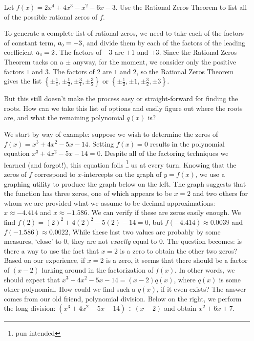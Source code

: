 \documentclass{ximera}
\begin{document}
\begin{example}
    Let $f(x) = 2x^4+4x^3-x^2-6x-3$. Use the Rational Zeros Theorem to list all of the possible rational zeros of $f$.
\end{example}

\begin{exampleSol}
    To generate a complete list of rational zeros, we need to take each of the factors of constant term, $a_{\mbox{\tiny$0$}} = -3$, and divide them by each of the factors of the leading coefficient $a_{\mbox{\tiny$4$}} = 2$.  The factors of $-3$ are $\pm  1$ and $\pm  3$.  Since the Rational Zeros Theorem tacks on a $\pm$ anyway, for the moment, we consider only the positive factors $1$ and $3$.  The factors of $2$ are  $1$ and $2$, so the Rational Zeros Theorem gives the list 
    $\left\{\pm  \frac{1}{1}, \pm  \frac{1}{2},  \pm  \frac{3}{1}, \pm  \frac{3}{2}\right\}$ or $\left\{\pm  \frac{1}{2}, \pm  1, \pm  \frac{3}{2}, \pm  3\right\}$.   
    \label{RZTex}
\end{exampleSol}

But this still doesn't make the process easy or straight-forward for finding the roots. How can we take this list of options and easily figure out where the roots are, and what the remaining polynomial $q(x)$ is?

We start by way of example:  suppose we wish to determine the zeros of  $f(x) = x^3 + 4x^2-5x-14$.  Setting $f(x)=0$ results in the polynomial equation $x^3 + 4x^2-5x-14=0$.   Despite all of the factoring techniques we learned (and forgot!), this equation foils%
\footnote{pun intended}
us at every turn. Knowing that the zeros of $f$ correspond to $x$-intercepts on the graph of $y=f(x)$, we use a graphing utility to produce the graph below on the left.  The graph suggests that the function has three zeros, one of which appears to be $x=2$ and two others for whom we are provided what we assume to be decimal approximations:  $x \approx -4.414$ and $x \approx -1.586$.    We can verify if these are zeros easily enough.   We find  $f(2) =(2)^2 + 4(2)^2-5(2)-14 = 0$,  but  $f(-4.414) \approx 0.0039$ and $f(-1.586) \approx 0.0022$,  While these last two values are probably by some measures,  `close' to $0$, they are not \textit{exactly} equal to $0$.  The question becomes:  is there a way to use the fact that $x=2$ is a zero to obtain the other two zeros?  Based on our experience, if $x=2$ is a zero, it seems that there should be a factor of $(x-2)$ lurking around in the factorization of $f(x)$.  In other words, we should expect that $x^3 + 4x^2-5x-14=(x-2)  q(x)$, where $q(x)$ is some other polynomial.  How could we find such a $q(x)$, if it even exists?  The answer comes from our old friend, polynomial division. Below on the right, we perform the long division:  $(x^3 + 4x^2-5x-14) \div (x-2)$ and obtain $x^2+6x+7$.
 
\end{document}
